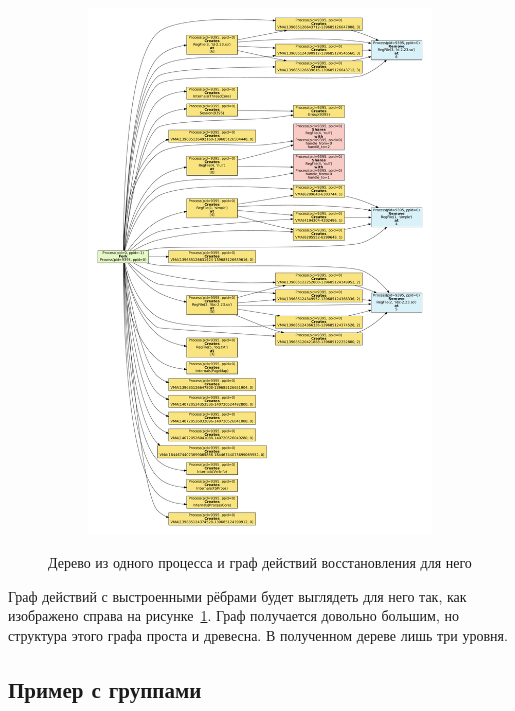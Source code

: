 \begin{figure}[ht!]
\begin{subfigure}[b]{0.5\textwidth}
		\includegraphics[width=\textwidth]{fig/exSimpleGraph.pdf}
	\end{subfigure}
	\caption{Дерево из одного процесса и граф действий восстановления для него}
	\label{chap2:fig:oneprocess}
\end{figure}

Граф действий с выстроенными рёбрами будет выглядеть для него так, как изображено справа на рисунке~\ref{chap2:fig:oneprocess}. Граф получается довольно большим, но структура этого графа проста и древесна. В полученном дереве лишь три уровня.

\newpage

\subsection{Пример с группами}

